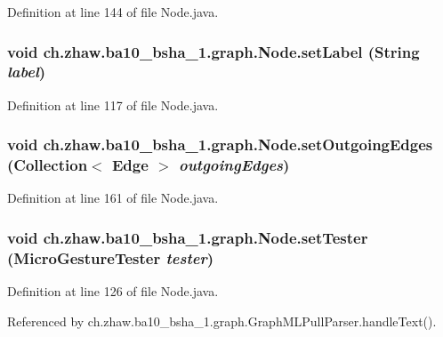 Definition at line 144 of file Node.java.\hypertarget{classch_1_1zhaw_1_1ba10__bsha__1_1_1graph_1_1Node_a1a6b348d6dba34a3f7b6ec9f742952f6}{
\subsubsection[{setLabel}]{\setlength{\rightskip}{0pt plus 5cm}void ch.zhaw.ba10\_\-bsha\_\-1.graph.Node.setLabel (String {\em label})}}
\label{classch_1_1zhaw_1_1ba10__bsha__1_1_1graph_1_1Node_a1a6b348d6dba34a3f7b6ec9f742952f6}


Definition at line 117 of file Node.java.\hypertarget{classch_1_1zhaw_1_1ba10__bsha__1_1_1graph_1_1Node_add712262f47c24d3af3b3fa4150566e1}{
\subsubsection[{setOutgoingEdges}]{\setlength{\rightskip}{0pt plus 5cm}void ch.zhaw.ba10\_\-bsha\_\-1.graph.Node.setOutgoingEdges (Collection$<$ {\bf Edge} $>$ {\em outgoingEdges})}}
\label{classch_1_1zhaw_1_1ba10__bsha__1_1_1graph_1_1Node_add712262f47c24d3af3b3fa4150566e1}


Definition at line 161 of file Node.java.\hypertarget{classch_1_1zhaw_1_1ba10__bsha__1_1_1graph_1_1Node_a6dcb93d4c25e370c84741db17e59d2af}{
\subsubsection[{setTester}]{\setlength{\rightskip}{0pt plus 5cm}void ch.zhaw.ba10\_\-bsha\_\-1.graph.Node.setTester ({\bf MicroGestureTester} {\em tester})}}
\label{classch_1_1zhaw_1_1ba10__bsha__1_1_1graph_1_1Node_a6dcb93d4c25e370c84741db17e59d2af}


Definition at line 126 of file Node.java.

Referenced by ch.zhaw.ba10\_\-bsha\_\-1.graph.GraphMLPullParser.handleText().

